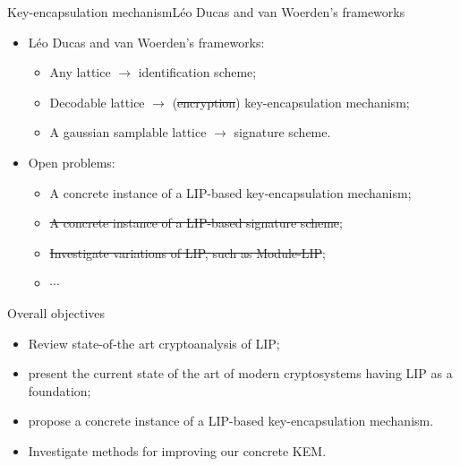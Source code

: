 \documentclass[10pt]{beamer}
\begin{document}
\begin{frame}{Key-encapsulation mechanism}{Léo Ducas and van Woerden's frameworks}
				\begin{itemize}
								\item Léo Ducas and van Woerden's frameworks:
												\begin{itemize}
																\justifying
																\item Any lattice $\xrightarrow{}$ identification scheme;
																\item Decodable lattice $\xrightarrow{}$ (\sout{encryption}) key-encapsulation mechanism;
																\item A gaussian samplable lattice $\xrightarrow{}$ signature scheme.
								\end{itemize}

								\item Open problems:
												\begin{itemize}
																\justifying
																\item A concrete instance of a LIP-based key-encapsulation mechanism;
																\item \sout{A concrete instance of a LIP-based signature scheme};
																\item \sout{Investigate variations of LIP, such as Module-LIP};
																\item $\cdots$
												\end{itemize}
				\end{itemize}

				\begin{block}{Overall objectives}\scriptsize
								\begin{itemize}
												\justifying
												\item Review state-of-the art cryptoanalysis of LIP;
												\item present the current state of the art of modern cryptosystems having LIP as a foundation;
												\item propose a concrete instance of a LIP-based key-encapsulation mechanism.
												\item Investigate methods for improving our concrete KEM.
								\end{itemize}
				\end{block}
\end{frame}
\end{document}
